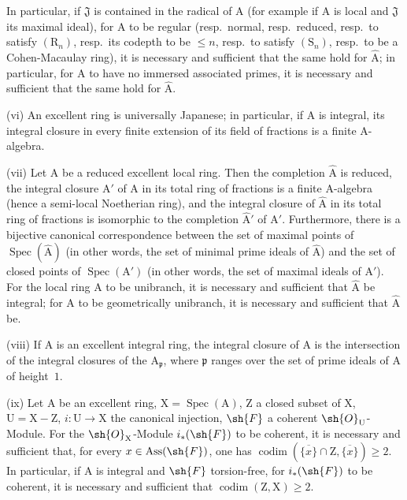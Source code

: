 \begin{scholium}[7.8.3]
In particular, if $\mathfrak{J}$ is contained in the radical of $\mathrm{A}$ (for example if $\mathrm{A}$ is local and $\mathfrak{J}$ its maximal ideal), for $\mathrm{A}$ to be regular (resp.\ normal, resp.\ reduced, resp.\ to satisfy $(\mathrm{R}_n)$, resp.\ its codepth to be $\leqslant n$, resp.\ to satisfy $(\mathrm{S}_n)$, resp.\ to be a Cohen-Macaulay ring), it is necessary and sufficient that the same hold for $\widehat{\mathrm{A}}$; in particular, for $\mathrm{A}$ to have no immersed associated primes, it is necessary and sufficient that the same hold for $\widehat{\mathrm{A}}$.

(vi) An excellent ring is universally Japanese; in particular, if $\mathrm{A}$ is integral, its integral closure in every finite extension of its field of fractions is a finite $\mathrm{A}$-algebra.

(vii) Let $\mathrm{A}$ be a reduced excellent local ring. Then the completion $\widehat{\mathrm{A}}$ is reduced, the integral closure $\mathrm{A}'$ of $\mathrm{A}$ in its total ring of fractions is a finite $\mathrm{A}$-algebra (hence a semi-local Noetherian ring), and the integral closure of $\widehat{\mathrm{A}}$ in its total ring of fractions is isomorphic to the completion $\widehat{\mathrm{A}}'$ of $\mathrm{A}'$. Furthermore, there is a bijective canonical correspondence between the set of maximal points of $\operatorname{Spec}(\widehat{\mathrm{A}})$ (in other words, the set of minimal prime ideals of $\widehat{\mathrm{A}}$) and the set of closed points of $\operatorname{Spec}(\mathrm{A}')$ (in other words, the set of maximal ideals of $\mathrm{A}'$). For the local ring $\mathrm{A}$ to be unibranch, it is necessary and sufficient that $\widehat{\mathrm{A}}$ be integral; for $\mathrm{A}$ to be geometrically unibranch, it is necessary and sufficient that $\widehat{\mathrm{A}}$ be.

(viii) If $\mathrm{A}$ is an excellent integral ring, the integral closure of $\mathrm{A}$ is the intersection of the integral closures of the $\mathrm{A}_\mathfrak{p}$, where $\mathfrak{p}$ ranges over the set of prime ideals of $\mathrm{A}$ of height~$1$.

(ix) Let $\mathrm{A}$ be an excellent ring, $\mathrm{X}=\operatorname{Spec}(\mathrm{A})$, $\mathrm{Z}$ a closed subset of $\mathrm{X}$, $\mathrm{U}=\mathrm{X}-\mathrm{Z}$, $i:\mathrm{U}\to\mathrm{X}$ the canonical injection, $\sh{F}$ a coherent $\sh{O}_\mathrm{U}$-Module. For the $\sh{O}_\mathrm{X}$-Module $i_*(\sh{F})$ to be coherent, it is necessary and sufficient that, for every $x\in\operatorname{Ass}(\sh{F})$, one has $\operatorname{codim}(\overline{\{x\}}\cap\mathrm{Z},\overline{\{x\}})\geqslant 2$. In particular, if $\mathrm{A}$ is integral and $\sh{F}$ torsion-free, for $i_*(\sh{F})$ to be coherent, it is necessary and sufficient that $\operatorname{codim}(\mathrm{Z},\mathrm{X})\geqslant 2$.


\end{scholium}

